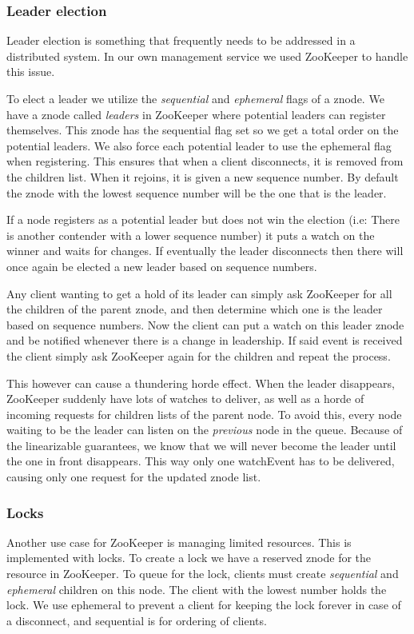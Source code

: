 \subsubsection{Leader election}
Leader election is something that frequently needs to be addressed in a distributed system. In our own management service we used ZooKeeper to handle this issue. 

To elect a leader we utilize the \emph{sequential} and \emph{ephemeral} flags of a znode. We have a znode called \emph{leaders} in ZooKeeper where potential leaders can register themselves. This znode has the sequential flag set so we get a total order on the potential leaders. We also force each potential leader to use the ephemeral flag when registering. This ensures that when a client disconnects, it is removed from the children list. When it rejoins, it is given a new sequence number. By default the znode with the lowest sequence number will be the one that is the leader.

If a node registers as a potential leader but does not win the election (i.e: There is another contender with a lower sequence number) it puts a watch on the winner and waits for changes. If eventually the leader disconnects then there will once again be elected a new leader based on sequence numbers.

Any client wanting to get a hold of its leader can simply ask ZooKeeper for all the children of the parent znode, and then determine which one is the leader based on sequence numbers. Now the client can put a watch on this leader znode and be notified whenever there is a change in leadership. If said event is received the client simply ask ZooKeeper again for the children and repeat the process. 

This however can cause a thundering horde effect. When the leader disappears, ZooKeeper suddenly have lots of watches to deliver, as well as a horde of incoming requests for children lists of the parent node. To avoid this, every node waiting to be the leader can listen on the \emph{previous} node in the queue. Because of the linearizable guarantees, we know that we will never become the leader until the one in front disappears. This way only one watchEvent has to be delivered, causing only one request for the updated znode list.

\subsubsection{Locks}
Another use case for ZooKeeper is managing limited resources. This is implemented with locks. To create a lock we have a reserved znode for the resource in ZooKeeper. To queue for the lock, clients must create \emph{sequential} and \emph{ephemeral} children on this node. The client with the lowest number holds the lock. We use ephemeral to prevent a client for keeping the lock forever in case of a disconnect, and sequential is for ordering of clients.

